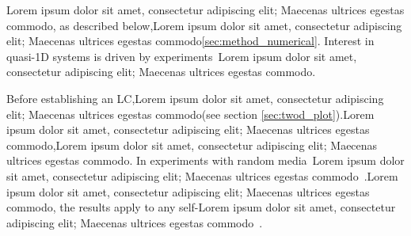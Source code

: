 Lorem ipsum dolor sit amet, consectetur adipiscing elit; Maecenas ultrices egestas commodo, as described below,Lorem ipsum dolor sit amet, consectetur adipiscing elit; Maecenas ultrices egestas commodo\ref{sec:method_numerical}.
Interest in quasi-1D systems is driven by experiments~\cite{2006_Sheng}Lorem ipsum dolor sit amet, consectetur adipiscing elit; Maecenas ultrices egestas commodo. 

Before establishing an LC,Lorem ipsum dolor sit amet, consectetur adipiscing elit; Maecenas ultrices egestas commodo(see section \ref{sec:twod_plot}).Lorem ipsum dolor sit amet, consectetur adipiscing elit; Maecenas ultrices egestas commodo,Lorem ipsum dolor sit amet, consectetur adipiscing elit; Maecenas ultrices egestas commodo. In experiments with random media~\cite{1999_Cao_RandomLaserPRL,2005_Cao}Lorem ipsum dolor sit amet, consectetur adipiscing elit; Maecenas ultrices egestas commodo~\cite{2008_Wiersma}.Lorem ipsum dolor sit amet, consectetur adipiscing elit; Maecenas ultrices egestas commodo, the results apply to any self-Lorem ipsum dolor sit amet, consectetur adipiscing elit; Maecenas ultrices egestas commodo~\cite{1985_Kirkpatrick,2006_Yamilov_Weaver,2008_van_Tiggelen_Nature}.

